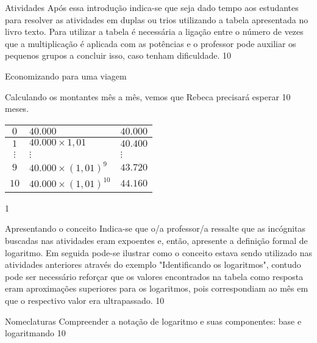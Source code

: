 \begin{sugestions}{Atividades}
{
	Após essa introdução indica-se que seja dado tempo aos estudantes para resolver as atividades em duplas ou trios utilizando a tabela apresentada no livro texto. Para utilizar a tabela é necessária a ligação entre o número de vezes que a multiplicação é aplicada com as potências e o professor pode auxiliar os pequenos grupos a concluir isso, caso tenham dificuldade.
}
{1}{0}
\end{sugestions}
\begin{answer}{Economizando para uma viagem}
{
	Calculando os montantes mês a mês, vemos que Rebeca precisará esperar 10 meses.
	\begin{table}[H]
	\centering

	\begin{tabu} to \textwidth{|c|l|l|}
	\hline
	\thead
	$0$ & $40.000$ & $40.000$ \\
	\hline
	$1$ & $40.000\times1{,}01$ & $40.400$ \\
	\hline
	$\vdots$ & $\vdots$ & $\vdots$ \\
	\hline
	$9$ & $40.000\times(1{,}01)^9$ & $43.720$ \\
	\hline
	$10$ & $40.000\times(1{,}01)^{10}$ & $44.160$ \\
	\hline
	\end{tabu}
	\end{table}
	}{1}
\end{answer}
\def\currentcolor{session4}
\begin{sugestions}{Apresentando o conceito}
{
	Indica-se que o/a professor/a ressalte que as incógnitas buscadas nas atividades eram expoentes e, então, apresente a definição formal de logaritmo. Em seguida pode-se ilustrar como o conceito estava sendo utilizado nas atividades anteriores através do exemplo "Identificando os logaritmos", contudo pode ser necessário reforçar que os valores encontrados na tabela como resposta eram aproximações superiores para os logaritmos, pois correspondiam ao mês em que o respectivo valor era ultrapassado.
}{1}{0}
\end{sugestions}
\begin{objectives}{Nomeclaturas}
{
Compreender a notação de logaritmo e suas componentes: base e logaritmando}
{1}{0}
\end{objectives}
\clearmargin


